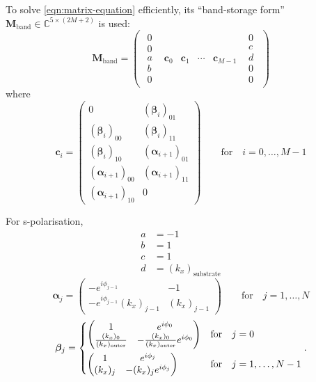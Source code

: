 \documentclass[]{article}
\begin{document}
	To solve \ref{eqn:matrix-equation} efficiently, its ``band-storage form'' $\mathbf{M}_\text{band}\in \mathbb{C}^{5\times(2M+2)}$ is used:
	\begin{equation}
		\mathbf{M}_\text{band}=
		\begin{pmatrix}
			\begin{matrix}0\\0\\a\\b\\0\end{matrix}&\bm{c}_0&\bm{c}_1&\cdots&\bm{c}_{M-1}&\begin{matrix}0\\c\\d\\0\\0\end{matrix}
		\end{pmatrix}
	\end{equation}
	where
	\begin{equation}
		\bm{c}_i=
		\begin{pmatrix}
			0&(\bm{\beta}_i)_{01}\\
			(\bm{\beta}_i)_{00}&(\bm{\beta}_i)_{11}\\
			(\bm{\beta}_i)_{10}&(\bm{\alpha}_{i+1})_{01}\\
			(\bm{\alpha}_{i+1})_{00}&(\bm{\alpha}_{i+1})_{11}\\
			(\bm{\alpha}_{i+1})_{10}&0
		\end{pmatrix}\quad\quad\text{for}\quad i=0,\dots,M-1
	\end{equation}

	For s-polarisation,
	\begin{align}
		a&=-1\\
		b&=1\\
		c&=1\\
		d&=(k_x)_\text{substrate}
	\end{align}
	\begin{equation}
		\bm{\alpha}_j=
		\begin{pmatrix}
			-e^{i\phi_{j-1}}&-1\\
			-e^{i\phi_{j-1}}(k_x)_{j-1}&(k_x)_{j-1}
		\end{pmatrix}\quad\quad\text{for}\quad j=1,\dots,N
	\end{equation}
	\begin{equation}
		\bm{\beta}_j=
		\begin{dcases}
			\begin{pmatrix}
				1&e^{i\phi_0}\\
				\frac{(k_x)_0}{(k_x)_\text{outer}}&-\frac{(k_x)_0}{(k_x)_\text{outer}}e^{i\phi_0}
			\end{pmatrix}&\text{for}\quad j=0\\
			\begin{pmatrix}
				1&e^{i\phi_j}\\
				(k_x)_j&-(k_x)_je^{i\phi_j}
			\end{pmatrix}&\text{for}\quad j=1,\dots,N-1
		\end{dcases}.
	\end{equation}
	
\end{document}
